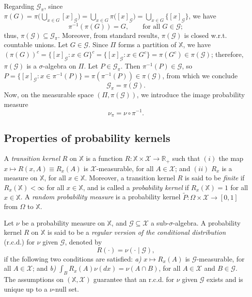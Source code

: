 \documentclass[a4paper]{article}
\theoremstyle{plain}
\theoremstyle{remark}
\theoremstyle{definition}
\begin{document}
Regarding $\mathcal{G}_\pi$, since $\pi(G)=\pi\bigl(\bigcup_{x\in G}[x]_\mathcal{G}\bigr)=\bigcup_{x\in G}\pi\bigl([x]_\mathcal{G}\bigr)=\bigcup_{x\in G}\bigl\{[x]_\mathcal{G}\bigr\}$, we have \begin{equation}\label{model:atoms:eq1}
\pi^{-1}(\pi(G))=G,\qquad\mbox{for all }G\in\mathcal{G};
\end{equation}
thus, $\pi(\mathcal{G})\subseteq\mathcal{G}_\pi$. Moreover, from standard results, $\pi(\mathcal{G})$ is closed w.r.t. countable unions. Let $G\in\mathcal{G}$. Since $\Pi$ forms a partition of $\mathbb{X}$, we have $(\pi(G))^c=\{[x]_\mathcal{G}:x\in G\}^c=\{[x]_\mathcal{G}:x\in G^c\}=\pi(G^c)\in \pi(\mathcal{G})$; therefore, $\pi(\mathcal{G})$ is a $\sigma$-algebra on $\Pi$. Let $P\in\mathcal{G}_\pi$. Then $\pi^{-1}(P)\in\mathcal{G}$, so $P=\{[x]_\mathcal{G}:x\in\pi^{-1}(P)\}=\pi(\pi^{-1}(P))\in\pi(\mathcal{G})$, from which we conclude
\[\mathcal{G}_\pi=\pi(\mathcal{G}).\]
Now, on the measurable space $(\Pi,\pi(\mathcal{G}))$, we introduce the image probability measure
\[\nu_\pi=\nu\circ\pi^{-1}.\]

\subsection{Properties of probability kernels}\label{section:kernel:rcd}

A \emph{transition kernel} $R$ on $\mathbb{X}$ is a function $R:\mathbb{X}\times\mathcal{X}\rightarrow\mathbb{R}_+$ such that $(i)$ the map $x\mapsto R(x,A)\equiv R_x(A)$ is $\mathcal{X}$-measurable, for all $A\in\mathcal{X}$; and $(ii)$ $R_x$ is a measure on $\mathbb{X}$, for all $x\in\mathbb{X}$. Moreover, a transition kernel $R$ is said to be \textit{finite} if $R_x(\mathbb{X})<\infty$ for all $x\in\mathbb{X}$, and is called a \textit{probability kernel} if $R_x(\mathbb{X})=1$ for all $x\in\mathbb{X}$. A \textit{random probability measure} is a probability kernel $\tilde{P}:\Omega\times\mathcal{X}\rightarrow[0,1]$ from $\Omega$ to $\mathbb{X}$.

Let $\nu$ be a probability measure on $\mathbb{X}$, and $\mathcal{G}\subseteq\mathcal{X}$ a sub-$\sigma$-algebra. A probability kernel $R$ on $\mathbb{X}$ is said to be a \emph{regular version of the conditional distribution} (r.c.d.) for $\nu$ given $\mathcal{G}$, denoted by
\[R(\cdot)=\nu(\cdot\mid\mathcal{G}),\]
if the following two conditions are satisfied: \textit{a)} $x \mapsto R_x(A)$ is $\mathcal{G}$-measurable, for all $A\in\mathcal{X}$; and \textit{b)} $\int_BR_x(A)\nu(dx)=\nu(A\cap B)$, for all $A\in\mathcal{X}$ and $B\in\mathcal{G}$. The assumptions on $(\mathbb{X},\mathcal{X})$ guarantee that an r.c.d. for $\nu$ given $\mathcal{G}$ exists and is unique up to a $\nu$-null set.
\end{document}
